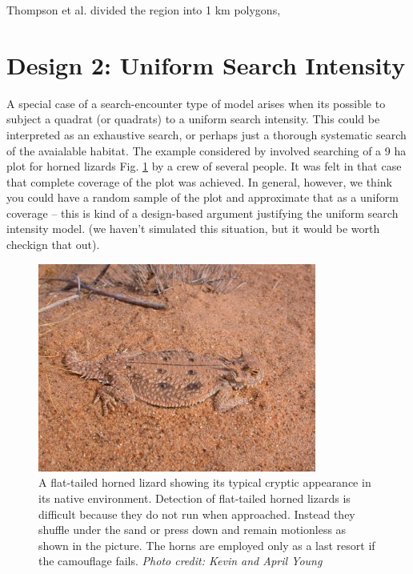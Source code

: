 Thompson et al. divided the region into 1 km polygons,






\section{Design 2: Uniform Search Intensity}

A special case of a search-encounter type of model arises when its
possible to subject a quadrat (or quadrats) to a uniform search
intensity. This could be interpreted as an exhaustive search, or
perhaps just a thorough systematic search of the avaialable habitat.
The example considered by \citet{royle_young:2008} involved searching
of a 9 ha plot for horned lizards Fig.
\ref{searchencounter.fig.hornylizard} by a crew of
several people. It was felt in that case that complete coverage of
the plot was achieved. In general, however, we think you could have
a random sample of the plot and approximate that as a uniform coverage
-- this is kind of a design-based argument justifying the uniform
search intensity model. (we haven't simulated this situation, but it
would be worth checkign that out).

\begin{figure}
\centering
\includegraphics[width=3.6in,height=2.7in]{Ch15-searchencounter/figs/horny_lizard.jpg}
\caption{A flat-tailed horned lizard showing its typical cryptic
  appearance in its native environment.  Detection of flat-tailed
  horned lizards is difficult because they do not run when
  approached. Instead they shuffle under the sand or press down and
  remain motionless as shown in the picture.  The horns are employed
  only as a last resort if the camouflage fails.  {\it Photo credit:
    Kevin and April Young} }
\label{searchencounter.fig.hornylizard}
\end{figure}

